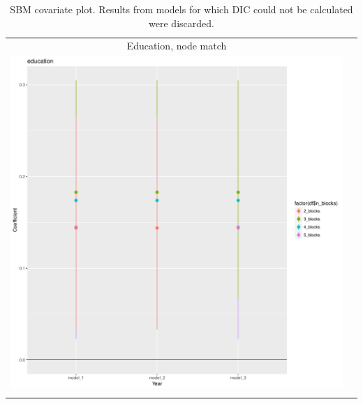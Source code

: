 \documentclass[fleqn,12pt]{wlscirep}
\begin{document}
\clearpage
\begin{longtable}[!h]{c@{\hskip 0cm}c}
Education, node match \\
\includegraphics[height=.75\textheight, clip=true, trim=.5cm .5cm 0cm .6cm]{figures/rl_plots1/education.pdf}   \\
\caption{\label{fig:SBM_plot_gov} SBM covariate plot. Results from models for which DIC could not be calculated were discarded.}
\end{longtable}
\end{document}
